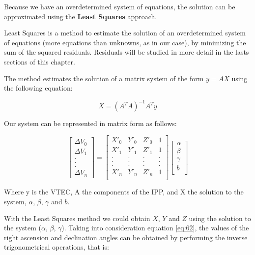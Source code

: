 Because we have an overdetermined system of equations, the solution can be approximated using the \textbf{Least Squares} approach. 

Least Squares is a method to estimate the solution of an overdetermined system of equations (more equations than unknowns, as in our case), by minimizing the sum of the squared residuals. Residuals will be studied in more detail in the lasts sections of this chapter.

The method estimates the solution of a matrix system of the form $y = AX$ using the following equation:

\begin{equation}\label{eq:mainEq}
X = (A^{T}A)^{-1}A^{T}y
\end{equation} 

Our system can be represented in matrix form  as follows:

\begin{equation} \label{eq:matrixSystem}
\begin{bmatrix}
\Delta V_{0} \\
\Delta V_{1} \\
. \\
. \\
. \\
\Delta V_{n}
\end{bmatrix}
=
\begin{bmatrix}
X'_{0} & Y'_{0} & Z'_{0} & 1 \\
X'_{1} & Y'_{1} & Z'_{1} & 1 \\
. & . & . & .\\
. & . & . & .\\
. & . & . & .\\
X'_{n} & Y'_{n} & Z'_{n} & 1 \\
\end{bmatrix}
\begin{bmatrix}
\alpha \\
\beta \\
\gamma \\
b \\
\end{bmatrix}
\end{equation}

Where y is the VTEC, A the components of the IPP, and X the solution to the system, $\alpha$, $\beta$, $\gamma$ and $b$.

With the Least Squares method we could obtain $X$, $Y$ and $Z$ using the solution to the system ($\alpha$, $\beta$, $\gamma$). Taking into consideration equation \ref{eq:62}, the values of the right ascension and declination angles can be obtained by performing the inverse trigonometrical operations, that is:


